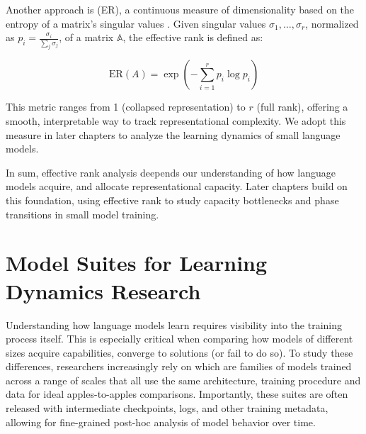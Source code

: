 Another approach is  (ER), a continuous measure of dimensionality based on the entropy of a matrix's singular values \citep{roy2007effectiverank}. Given singular values $\sigma_1, \dots, \sigma_r$, normalized as $p_i = \frac{\sigma_i}{\sum_j \sigma_j}$, of a matrix $\mathbb{A}$, the effective rank is defined as:

\[
\mathrm{ER}(A) = \exp\left(-\sum_{i=1}^r p_i \log p_i\right)
\]

This metric ranges from 1 (collapsed representation) to $r$ (full rank), offering a smooth, interpretable way to track representational complexity. We adopt this measure in later chapters to analyze the learning dynamics of small language models.



In sum, effective rank analysis deepends our understanding of how language models acquire, and allocate representational capacity.  Later chapters build on this foundation, using effective rank to study capacity bottlenecks and phase transitions in small model training.

\section{Model Suites for Learning Dynamics Research}

Understanding how language models learn requires visibility into the training process itself. This is especially critical when comparing how models of different sizes acquire capabilities, converge to solutions (or fail to do so). To study these differences, researchers increasingly rely on  which are families of models trained across a range of scales that all use the same architecture, training procedure and data for ideal apples-to-apples comparisons. Importantly, these suites are often released with intermediate checkpoints, logs, and other training metadata, allowing for fine-grained post-hoc analysis of model behavior over time.

